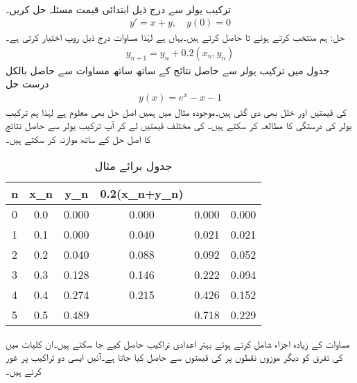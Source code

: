 \quad {}\\
ترکیب یولر سے درج ذیل ابتدائی قیمت مسئلہ حل کریں۔
\begin{align*}
y'=x+y,\quad y(0)=0
\end{align*}
حل:\quad
ہم  منتخب کرتے ہوئے  تا   حاصل کرتے ہیں۔یہاں  ہے لہٰذا مساوات  درج ذیل روپ اختیار کرتی ہے۔
\begin{align*}
y_{n+1}=y_n+0.2(x_n,y_n)
\end{align*}
جدول  میں ترکیب یولر سے حاصل نتائج کے ساتھ ساتھ مساوات  سے حاصل بالکل درست حل
\begin{align*}
y(x)=e^x-x-1
\end{align*}
کی قیمتیں اور خلل بھی دی گئی ہیں۔موجودہ مثال میں ہمیں اصل حل بھی معلوم ہے لہٰذا ہم ترکیب یولر کی درستگی کا مطالعہ کر سکتے ہیں۔ کی مختلف قیمتیں لے کر آپ ترکیب یولر سے حاصل نتائج کا اصل حل کے ساتھ موازنہ کر سکتے ہیں۔
\begin{table}
\caption{جدول برائے مثال }
\label{جدول_مثال_اعدادی_ترکیب_یولر_الف}
\centering
\begin{otherlanguage}{english}
\begin{tabular}{C|C|C|C|C|C}
\hline
n&x_n&y_n&0.2(x_n+y_n)&&\\
&0.0&0.000&0.000&0.000&0.000\\
1&0.1&0.000&0.040&0.021&0.021\\
2&0.2&0.040&0.088&0.092&0.052\\
3&0.3&0.128&0.146&0.222&0.094\\
4&0.4&0.274&0.215&0.426&0.152\\
5&0.5&0.489&&0.718&0.229\\
\hline
\end{tabular}
\end{otherlanguage}
\end{table}

مساوات  کے زیادہ اجزاء شامل کرتے ہوئے بہتر اعدادی تراکیب حاصل کیے جا سکتے ہیں۔ان کلیات میں  کی تفرق کو دیگر موزوں نقطوں پر  کی قیمتوں سے حاصل کیا جاتا  ہے۔آئیں ایسی دو تراکیب پر غور کرتے ہیں۔

